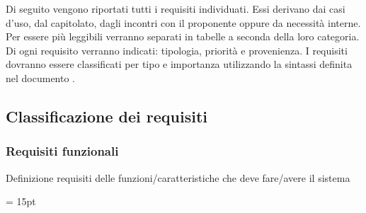 Di seguito vengono riportati tutti i requisiti individuati. Essi derivano dai casi d’uso,
dal capitolato, dagli incontri con il proponente oppure da necessità interne. Per essere
più leggibili verranno separati in tabelle a seconda della loro categoria. Di ogni requisito
verranno indicati: tipologia, priorità e provenienza.
I requisiti dovranno essere classificati per tipo e importanza utilizzando la sintassi definita nel documento \NdP.
\subsection{Classificazione dei requisiti} 
    \subsubsection{Requisiti funzionali}
    Definizione requisiti delle funzioni/caratteristiche che deve fare/avere il sistema
    

    \tabulinesep = 15pt
    \everyrow{\tabucline[.4mm  white]{}}
    
